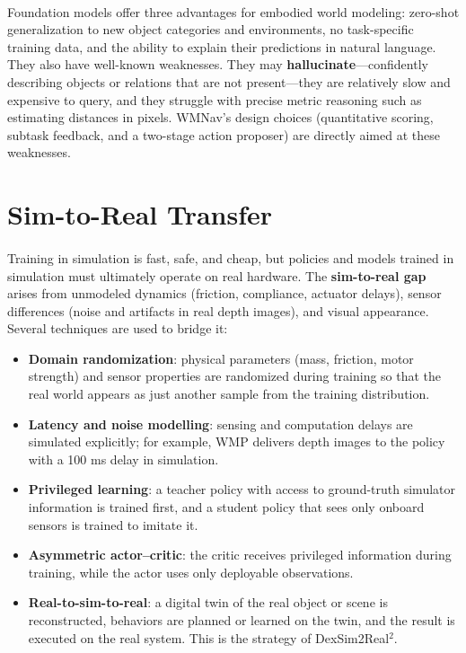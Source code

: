 \documentclass[12pt,a4paper,final]{extreport}
\begin{document}
\paragraph{} Foundation models offer three advantages for embodied world modeling: zero-shot generalization to new object categories and environments, no task-specific training data, and the ability to explain their predictions in natural language. They also have well-known weaknesses. They may \textbf{hallucinate}---confidently describing objects or relations that are not present---they are relatively slow and expensive to query, and they struggle with precise metric reasoning such as estimating distances in pixels. WMNav's design choices (quantitative scoring, subtask feedback, and a two-stage action proposer) are directly aimed at these weaknesses.

\section{Sim-to-Real Transfer}

\paragraph{} Training in simulation is fast, safe, and cheap, but policies and models trained in simulation must ultimately operate on real hardware. The \textbf{sim-to-real gap} arises from unmodeled dynamics (friction, compliance, actuator delays), sensor differences (noise and artifacts in real depth images), and visual appearance. Several techniques are used to bridge it:
\begin{itemize}
  \item \textbf{Domain randomization}: physical parameters (mass, friction, motor strength) and sensor properties are randomized during training so that the real world appears as just another sample from the training distribution.
  \item \textbf{Latency and noise modelling}: sensing and computation delays are simulated explicitly; for example, WMP delivers depth images to the policy with a 100 ms delay in simulation.
  \item \textbf{Privileged learning}: a teacher policy with access to ground-truth simulator information is trained first, and a student policy that sees only onboard sensors is trained to imitate it.
  \item \textbf{Asymmetric actor--critic}: the critic receives privileged information during training, while the actor uses only deployable observations.
  \item \textbf{Real-to-sim-to-real}: a digital twin of the real object or scene is reconstructed, behaviors are planned or learned on the twin, and the result is executed on the real system. This is the strategy of DexSim2Real$^2$.
\end{itemize}
\end{document}
